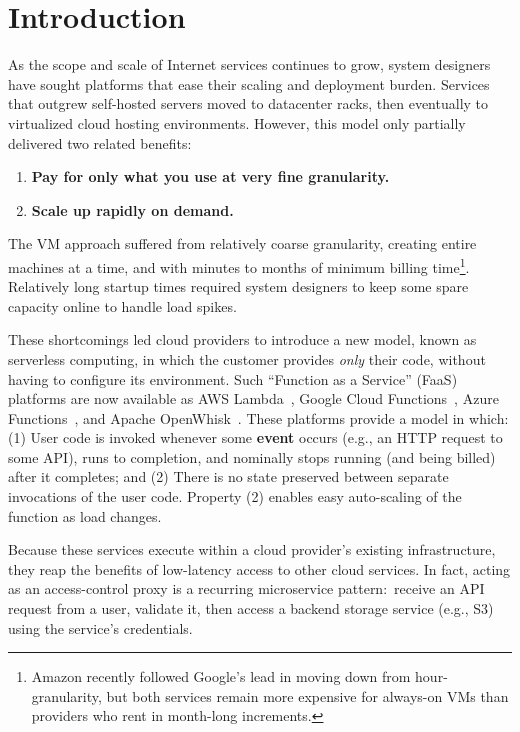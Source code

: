 \section{Introduction}
\label{sec:intro}

As the scope and scale of Internet services continues to grow, system designers
have sought platforms that ease their scaling and deployment burden.
Services that outgrew self-hosted servers moved to datacenter racks, then eventually to virtualized cloud hosting environments.
However, this model only partially delivered two related benefits:
\begin{enumerate}
\item \textbf{Pay for only what you use at very fine granularity.}
\item \textbf{Scale up rapidly on demand.}
\end{enumerate}

The VM approach suffered from relatively coarse granularity, creating entire
machines at a time, and with minutes to months of minimum billing
time\footnote{Amazon recently followed Google's lead in moving down from
  hour-granularity, but both services remain more expensive for always-on VMs
  than providers who rent in month-long increments.}.  Relatively long startup
times required system designers to keep some spare capacity online to handle load
spikes.

These shortcomings led cloud providers to introduce a new model, known as
serverless computing, in which the customer provides \textit{only} their code,
without having to configure its environment.   Such ``Function as a Service''
(FaaS) platforms are now available as AWS Lambda~\cite{www-amazon-lambda}, Google
Cloud Functions~\cite{www-google-cf}, Azure Functions~\cite{www-microsoft-af}, and
Apache OpenWhisk~\cite{www-apache-openwhisk}.  These platforms provide a model in
which: (1)  User code is invoked whenever some \textbf{event} occurs (e.g., an HTTP
request to some API), runs to completion, and nominally stops running (and being
billed) after it completes; and (2)  There is no state preserved between
separate invocations of the user code.  Property (2) enables easy auto-scaling
of the function as load changes.

Because these services execute within a cloud provider's existing
infrastructure, they reap the benefits of low-latency access to other cloud
services.  In fact, acting as an access-control proxy is a recurring microservice
pattern:\ receive an API request from a user, validate it, then access
a backend storage service (e.g., S3) using the service's credentials.


